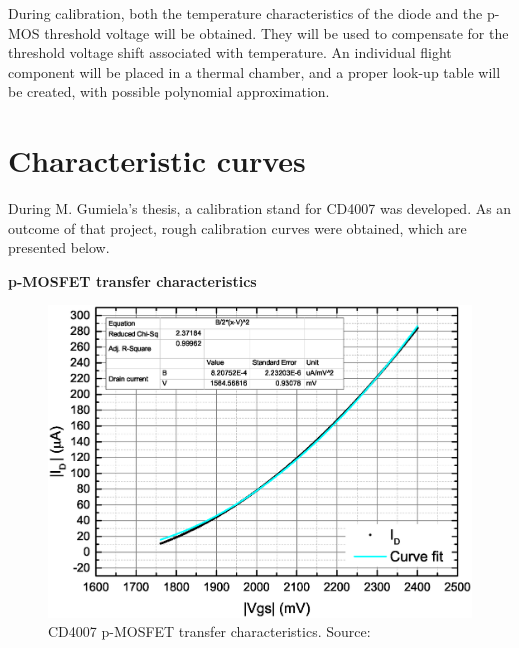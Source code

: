     During calibration, both the temperature characteristics of the diode and the p-MOS threshold voltage will be obtained. They will be used to compensate for the threshold voltage shift associated with temperature. An individual flight component will be placed in a thermal chamber, and a proper look-up table will be created, with possible polynomial approximation.


\section{Characteristic curves}
\label{Characteristic_curves}

    During M. Gumiela's thesis, \cite{MGThesis} a calibration stand for CD4007 was developed. As an outcome of that project, rough calibration curves were obtained, which are presented below.

    \bigskip \textbf{p-MOSFET transfer characteristics}
    \begin{figure}[H]
        \centering
        \includegraphics[width=0.7\paperwidth]{img/05/mg_iv_mosfet.eps}
        \caption{CD4007 p-MOSFET transfer characteristics. Source: \cite{MGThesis}}
        \label{CD4007_p-MOSFET_transfer}
    \end{figure}

